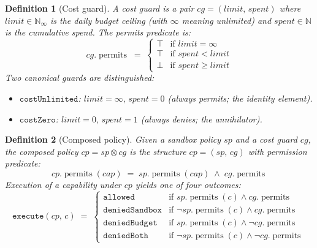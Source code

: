 \documentclass[sigconf]{acmart}
\newtheorem{definition}{Definition}
\newcommand{\compose}{\mathbin{\otimes}}
\newcommand{\permits}{\operatorname{permits}}
\newcommand{\SP}{\mathit{sp}}
\newcommand{\CG}{\mathit{cg}}
\newcommand{\CP}{\mathit{cp}}
\begin{document}
\begin{definition}[Cost guard]
\label{def:costguard}
A \emph{cost guard} is a pair $\CG = (\mathit{limit},\,\mathit{spent})$ where
$\mathit{limit} \in \mathbb{N}_\infty$ is the daily budget ceiling (with
$\infty$ meaning unlimited) and $\mathit{spent} \in \mathbb{N}$ is the
cumulative spend.  The \emph{permits} predicate is:
\[
  \CG.\permits \;=\; \begin{cases}
    \top & \text{if } \mathit{limit} = \infty \\
    \top & \text{if } \mathit{spent} < \mathit{limit} \\
    \bot & \text{if } \mathit{spent} \geq \mathit{limit}
  \end{cases}
\]
Two canonical guards are distinguished:
\begin{itemize}
  \item $\mathtt{costUnlimited}$: $\mathit{limit} = \infty,\,\mathit{spent} = 0$
        (always permits; the identity element).
  \item $\mathtt{costZero}$: $\mathit{limit} = 0,\,\mathit{spent} = 1$
        (always denies; the annihilator).
\end{itemize}
\end{definition}

\begin{definition}[Composed policy]
\label{def:composed}
Given a sandbox policy $\SP$ and a cost guard $\CG$, the \emph{composed
policy} $\CP = \SP \compose \CG$ is the structure
$\CP = (\SP,\,\CG)$ with permission predicate:
\[
  \CP.\permits(\mathit{cap}) \;=\; \SP.\permits(\mathit{cap}) \;\wedge\; \CG.\permits
\]
Execution of a capability under $\CP$ yields one of four outcomes:
\[
  \mathtt{execute}(\CP,\,c) \;=\; \begin{cases}
    \mathtt{allowed}       & \text{if } \SP.\permits(c) \wedge \CG.\permits \\
    \mathtt{deniedSandbox} & \text{if } \neg\SP.\permits(c) \wedge \CG.\permits \\
    \mathtt{deniedBudget}  & \text{if } \SP.\permits(c) \wedge \neg\CG.\permits \\
    \mathtt{deniedBoth}    & \text{if } \neg\SP.\permits(c) \wedge \neg\CG.\permits
  \end{cases}
\]
\end{definition}
\end{document}

